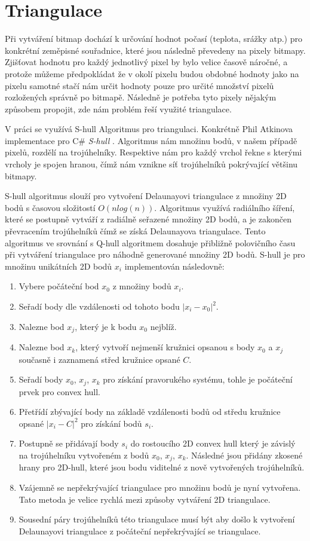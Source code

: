 \documentclass[czech,bachelor,dept460,male,csharp,cpdeclaration]{diploma}
\begin{document}
	\section{Triangulace}
	
	Při vytváření bitmap dochází k určování hodnot počasí (teplota, srážky atp.) pro konkrétní zeměpisné souřadnice, které jsou následně převedeny na pixely bitmapy. Zjišťovat hodnotu pro každý jednotlivý pixel by bylo velice časově náročné, a protože můžeme předpokládat že v okolí pixelu budou obdobné hodnoty jako na pixelu samotné stačí nám určit hodnoty pouze pro určité množství pixelů rozložených správně po bitmapě. Následně je potřeba tyto pixely nějakým způsobem propojit, zde nám problém řeší využité triangulace.
	
	V práci se využívá S-hull Algoritmus pro triangulaci. Konkrétně Phil Atkinova implementace pro C\# \emph{S-hull} \cite{shull}. Algoritmus nám množinu bodů, v našem případě pixelů, rozdělí na trojúhelníky. Respektive nám pro každý vrchol řekne s kterými vrcholy je spojen hranou, čímž nám vznikne síť trojúhelníků pokrývající většinu bitmapy.
	
	
	S-hull algoritmus slouží pro vytvoření Delaunayovi triangulace z množiny 2D bodů s časovou složitostí $O(n  log(n))$. Algoritmus využívá radiálního šíření, které se postupně vytváří z radiálně seřazené množiny 2D bodů, a je zakončen převracením trojúhelníků čímž se získá Delaunayova triangulace. Tento algoritmus ve srovnání s Q-hull algoritmem dosahuje přibližně polovičního času při vytváření triangulace pro náhodně generované množiny 2D bodů. S-hull je pro množinu unikátních 2D bodů $x_i$ implementován následovně:
	\begin{enumerate}
		\item Vybere počáteční bod $x_0$ z množiny bodů $x_i$.
		\item Seřadí body dle vzdálenosti od tohoto bodu $|x_i - x_0|^2$.
		\item Nalezne bod $x_j$, který je k bodu $x_0$ nejblíž.
		\item Nalezne bod $x_k$, který vytvoří nejmenší kružnici opsanou s body $x_0$ a $x_j$ současně i zaznamená střed kružnice opsané $C$.
		\item Seřadí body $x_0$, $x_j$, $x_k$ pro získání pravorukého systému, tohle je počáteční prvek pro convex hull.
		\item Přetřídí zbývající body na základě vzdálenosti bodů od středu kružnice opsané $|x_i - C|^2$ pro získání bodů $s_i$.
		\item Postupně se přidávají body $s_i$ do rostoucího 2D convex hull který je závislý na trojúhelníku vytvořeném z bodů $x_0$, $x_j$, $x_k$. Následné jsou přidány zkosené hrany pro 2D-hull, které jsou bodu viditelné z nově vytvořených trojúhelníků.
		\item Vzájemně se nepřekrývající triangulace pro množinu bodů je nyní vytvořena. Tato metoda je velice rychlá mezi způsoby vytváření 2D triangulace.
		\item Sousední páry trojúhelníků této triangulace musí být  aby došlo k vytvoření Delaunayovi triangulace z počáteční nepřekrývající se triangulace.
	\end{enumerate}
	
\end{document}
